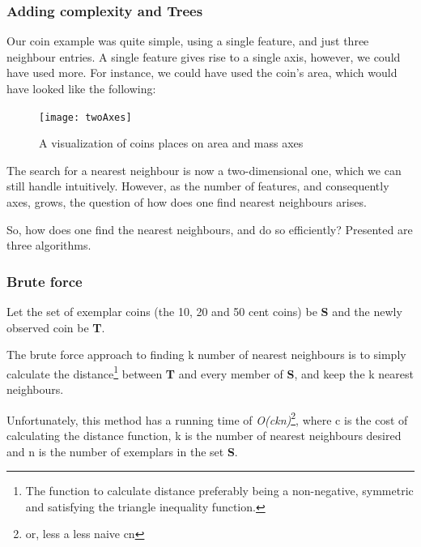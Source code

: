 \documentclass[a4paper, 12pt]{article}
\begin{document}
            \newpage


            \subsubsection{Adding complexity and Trees}

                \par Our coin example was quite simple, using a single feature, and just three neighbour entries. A single feature gives rise to a single axis, however, we could have used more. For instance, we could have used the coin's area, which would have looked like the following:
                
                \begin{figure}[h]
                    \caption{A visualization of coins places on area and mass axes}
                    \centering
                    \texttt{[image: twoAxes]}
                \end{figure}

                \par The search for a nearest neighbour is now a two-dimensional one, which we can still handle intuitively. However, as the number of features, and consequently axes, grows, the question of how does one find nearest neighbours arises.

                \par So, how does one find the nearest neighbours, and do so efficiently? Presented are three algorithms.
                
                
                \subsubsection{Brute force}
                
                    \par Let the set of exemplar coins (the 10, 20 and 50 cent coins) be \textbf{S} and the newly observed coin be \textbf{T}. 
                    
                    \par The brute force approach to finding k number of nearest neighbours is to simply calculate the distance\footnote{The function to calculate distance preferably being a non-negative, symmetric and satisfying the triangle inequality function.} between \textbf{T} and every member of \textbf{S}, and keep the k nearest neighbours.
                    
                    \par Unfortunately, this method has a running time of \textit{O(ckn)}\footnote{or, less a less naive cn}, where c is the cost of calculating the distance function, k is the number of nearest neighbours desired and n is the number of exemplars in the set \textbf{S}.
                    
\end{document}
